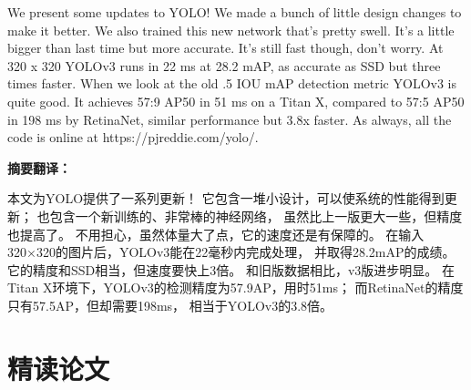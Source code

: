 \documentclass[a4paper, notitlepage]{article}
\begin{document}
We present some updates to YOLO! We made a bunch
of little design changes to make it better. We also trained
this new network that’s pretty swell. It’s a little bigger than
last time but more accurate. It’s still fast though, don’t
worry. At 320 x 320 YOLOv3 runs in 22 ms at 28.2 mAP,
as accurate as SSD but three times faster. When we look
at the old .5 IOU mAP detection metric YOLOv3 is quite
good. It achieves 57:9 AP50 in 51 ms on a Titan X, compared
to 57:5 AP50 in 198 ms by RetinaNet, similar performance
but 3.8x faster. As always, all the code is online at
https://pjreddie.com/yolo/.

\textbf{摘要翻译：}

本文为YOLO提供了一系列更新！
它包含一堆小设计，可以使系统的性能得到更新；
也包含一个新训练的、非常棒的神经网络，
虽然比上一版更大一些，但精度也提高了。
不用担心，虽然体量大了点，它的速度还是有保障的。
在输入320×320的图片后，YOLOv3能在22毫秒内完成处理，
并取得28.2mAP的成绩。它的精度和SSD相当，但速度要快上3倍。
和旧版数据相比，v3版进步明显。
在Titan X环境下，YOLOv3的检测精度为57.9AP，用时51ms；
而RetinaNet的精度只有57.5AP，但却需要198ms，
相当于YOLOv3的3.8倍。

\section{精读论文}
\end{document}
